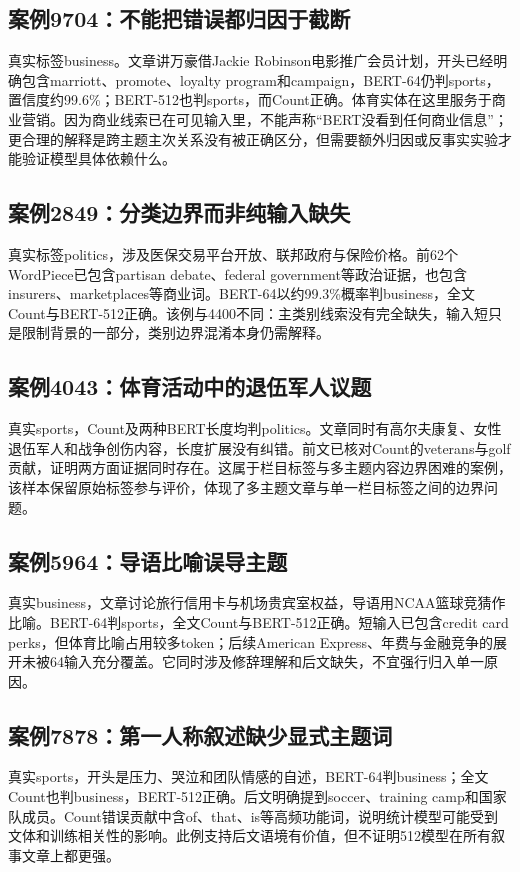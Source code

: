 \documentclass[UTF8,a4paper,11pt,fontset=fandol]{ctexart}
\begin{document}
\subsection{案例9704：不能把错误都归因于截断}
真实标签business。文章讲万豪借Jackie Robinson电影推广会员计划，开头已经明确包含marriott、promote、loyalty program和campaign，BERT-64仍判sports，置信度约99.6\%；BERT-512也判sports，而Count正确。体育实体在这里服务于商业营销。因为商业线索已在可见输入里，不能声称“BERT没看到任何商业信息”；更合理的解释是跨主题主次关系没有被正确区分，但需要额外归因或反事实实验才能验证模型具体依赖什么。

\subsection{案例2849：分类边界而非纯输入缺失}
真实标签politics，涉及医保交易平台开放、联邦政府与保险价格。前62个WordPiece已包含partisan debate、federal government等政治证据，也包含insurers、marketplaces等商业词。BERT-64以约99.3\%概率判business，全文Count与BERT-512正确。该例与4400不同：主类别线索没有完全缺失，输入短只是限制背景的一部分，类别边界混淆本身仍需解释。

\subsection{案例4043：体育活动中的退伍军人议题}
真实sports，Count及两种BERT长度均判politics。文章同时有高尔夫康复、女性退伍军人和战争创伤内容，长度扩展没有纠错。前文已核对Count的veterans与golf贡献，证明两方面证据同时存在。这属于栏目标签与多主题内容边界困难的案例，该样本保留原始标签参与评价，体现了多主题文章与单一栏目标签之间的边界问题。

\subsection{案例5964：导语比喻误导主题}
真实business，文章讨论旅行信用卡与机场贵宾室权益，导语用NCAA篮球竞猜作比喻。BERT-64判sports，全文Count与BERT-512正确。短输入已包含credit card perks，但体育比喻占用较多token；后续American Express、年费与金融竞争的展开未被64输入充分覆盖。它同时涉及修辞理解和后文缺失，不宜强行归入单一原因。

\subsection{案例7878：第一人称叙述缺少显式主题词}
真实sports，开头是压力、哭泣和团队情感的自述，BERT-64判business；全文Count也判business，BERT-512正确。后文明确提到soccer、training camp和国家队成员。Count错误贡献中含of、that、is等高频功能词，说明统计模型可能受到文体和训练相关性的影响。此例支持后文语境有价值，但不证明512模型在所有叙事文章上都更强。
\end{document}
